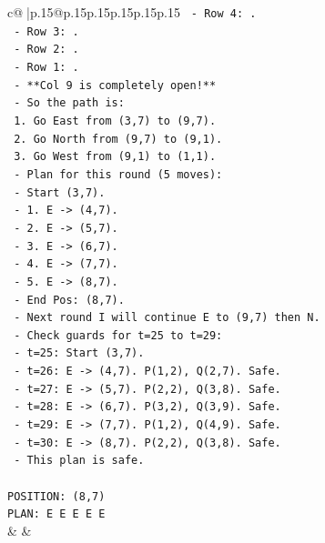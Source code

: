 \documentclass{article}
\begin{document}
{\begin{supertabular}{c@{$\;$}|p{.15\linewidth}@{}p{.15\linewidth}p{.15\linewidth}p{.15\linewidth}p{.15\linewidth}p{.15\linewidth}}
{{{\texttt{    {-} Row 4: .} \\
\texttt{    {-} Row 3: .} \\
\texttt{    {-} Row 2: .} \\
\texttt{    {-} Row 1: .} \\
\texttt{    {-} **Col 9 is completely open!**} \\
\texttt{  {-} So the path is:} \\
\texttt{    1. Go East from (3,7) to (9,7).} \\
\texttt{    2. Go North from (9,7) to (9,1).} \\
\texttt{    3. Go West from (9,1) to (1,1).} \\
\texttt{  {-} Plan for this round (5 moves):} \\
\texttt{    {-} Start (3,7).} \\
\texttt{    {-} 1. E {-}> (4,7).} \\
\texttt{    {-} 2. E {-}> (5,7).} \\
\texttt{    {-} 3. E {-}> (6,7).} \\
\texttt{    {-} 4. E {-}> (7,7).} \\
\texttt{    {-} 5. E {-}> (8,7).} \\
\texttt{    {-} End Pos: (8,7).} \\
\texttt{  {-} Next round I will continue E to (9,7) then N.} \\
\texttt{  {-} Check guards for t=25 to t=29:} \\
\texttt{    {-} t=25: Start (3,7).} \\
\texttt{    {-} t=26: E {-}> (4,7). P(1,2), Q(2,7). Safe.} \\
\texttt{    {-} t=27: E {-}> (5,7). P(2,2), Q(3,8). Safe.} \\
\texttt{    {-} t=28: E {-}> (6,7). P(3,2), Q(3,9). Safe.} \\
\texttt{    {-} t=29: E {-}> (7,7). P(1,2), Q(4,9). Safe.} \\
\texttt{    {-} t=30: E {-}> (8,7). P(2,2), Q(3,8). Safe.} \\
\texttt{  {-} This plan is safe.} \\
\\ 
\texttt{POSITION: (8,7)} \\
\texttt{PLAN: E E E E E} \\
            }
        }
    }
    & & \\ \\


\end{supertabular}}
\end{document}
